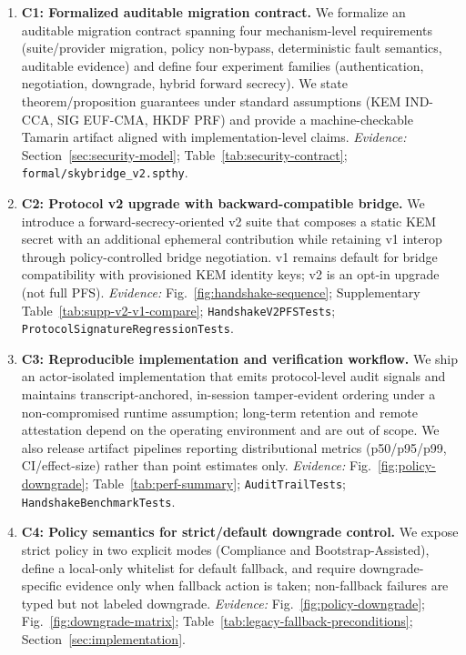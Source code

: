 \documentclass[10pt,journal,compsoc]{IEEEtran}
\begin{document}
\begin{enumerate}
\item
  \textbf{C1: Formalized auditable migration contract.}
  We formalize an auditable migration contract spanning four
  mechanism-level requirements (suite/provider migration, policy
  non-bypass, deterministic fault semantics, auditable evidence) and
  define four experiment families (authentication, negotiation,
  downgrade, hybrid forward secrecy). We state theorem/proposition
  guarantees under standard assumptions (KEM IND-CCA, SIG EUF-CMA, HKDF
  PRF) and provide a machine-checkable Tamarin artifact aligned with
  implementation-level claims.
  \textit{Evidence:} Section~\ref{sec:security-model}; Table~\ref{tab:security-contract};
  \texttt{formal/skybridge\_v2.spthy}.
\item
  \textbf{C2: Protocol v2 upgrade with backward-compatible bridge.}
  We introduce a forward-secrecy-oriented v2 suite that composes a
  static KEM secret with an additional ephemeral contribution while
  retaining v1 interop through policy-controlled bridge negotiation.
  v1 remains default for bridge compatibility with provisioned KEM
  identity keys; v2 is an opt-in upgrade (not full PFS).
  \textit{Evidence:} Fig.~\ref{fig:handshake-sequence};
  Supplementary Table~\ref{tab:supp-v2-v1-compare};
  \texttt{HandshakeV2PFSTests};
  \texttt{ProtocolSignatureRegressionTests}.
\item
  \textbf{C3: Reproducible implementation and verification workflow.}
  We ship an actor-isolated implementation that emits protocol-level
  audit signals and maintains transcript-anchored, in-session
  tamper-evident ordering under a non-compromised runtime assumption;
  long-term retention and remote attestation depend on the operating
  environment and are out of scope. We
  also release artifact pipelines reporting distributional metrics
  (p50/p95/p99, CI/effect-size) rather than point estimates only.
  \textit{Evidence:} Fig.~\ref{fig:policy-downgrade}; Table~\ref{tab:perf-summary};
  \texttt{AuditTrailTests};
  \texttt{Handshake\allowbreak Benchmark\allowbreak Tests}.
\item
  \textbf{C4: Policy semantics for strict/default downgrade control.}
  We expose strict policy in two explicit modes (Compliance and
  Bootstrap-Assisted), define a local-only whitelist for default fallback,
  and require downgrade-specific evidence only when fallback action is
  taken; non-fallback failures are typed but not labeled downgrade.
  \textit{Evidence:} Fig.~\ref{fig:policy-downgrade}; Fig.~\ref{fig:downgrade-matrix};
  Table~\ref{tab:legacy-fallback-preconditions}; Section~\ref{sec:implementation}.
\end{enumerate}
\end{document}

